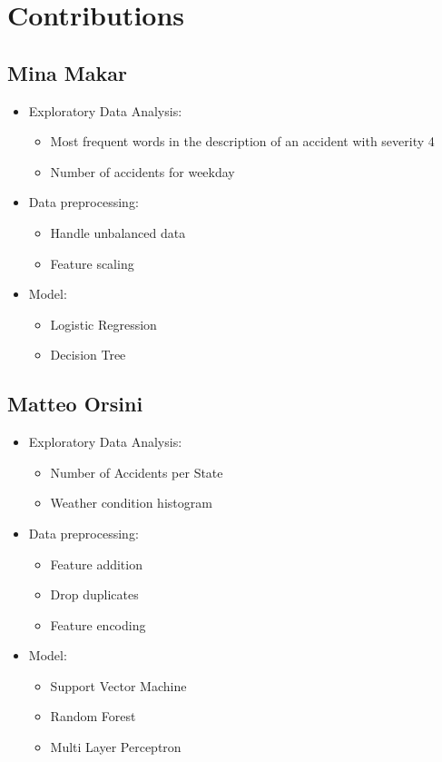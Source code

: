 \documentclass{article}
\begin{document}
\newpage
\null
\newpage
\null

\section{Contributions}

\subsection*{Mina Makar}
\begin{itemize}
\item Exploratory Data Analysis:
	\begin{itemize}
	\item Most frequent words in the description of an accident with severity 4
	\item Number of accidents for weekday
	\end{itemize}
\item Data preprocessing:
	\begin{itemize}
	\item Handle unbalanced data
	\item Feature scaling
	\end{itemize}
\item Model:
	\begin{itemize}
	\item Logistic Regression
	\item Decision Tree
	\end{itemize}
\end{itemize}

\subsection*{Matteo Orsini}
\begin{itemize}
\item Exploratory Data Analysis:
	\begin{itemize}
	\item Number of Accidents per State
	\item Weather condition histogram
	\end{itemize}
\item Data preprocessing:
	\begin{itemize}
	\item Feature addition
	\item Drop duplicates
	\item Feature encoding
	\end{itemize}
\item Model:
	\begin{itemize}
	\item Support Vector Machine
	\item Random Forest
	\item Multi Layer Perceptron
	\end{itemize}
\end{itemize}
\end{document}
